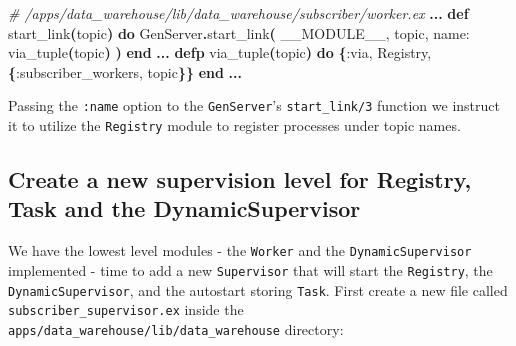 \documentclass[
  oneside]{book}
\newenvironment{Shaded}{\begin{snugshade}}{\end{snugshade}}
\newcommand{\CommentTok}[1]{\textcolor[rgb]{0.56,0.35,0.01}{\textit{#1}}}
\newcommand{\ConstantTok}[1]{\textcolor[rgb]{0.56,0.35,0.01}{#1}}
\newcommand{\FunctionTok}[1]{\textcolor[rgb]{0.13,0.29,0.53}{\textbf{#1}}}
\newcommand{\KeywordTok}[1]{\textcolor[rgb]{0.13,0.29,0.53}{\textbf{#1}}}
\newcommand{\NormalTok}[1]{#1}
\newcommand{\OperatorTok}[1]{\textcolor[rgb]{0.81,0.36,0.00}{\textbf{#1}}}
\newcommand{\VariableTok}[1]{\textcolor[rgb]{0.00,0.00,0.00}{#1}}
\begin{document}
\begin{Shaded}
\begin{Highlighting}[]
  \CommentTok{\# /apps/data\_warehouse/lib/data\_warehouse/subscriber/worker.ex}
  \OperatorTok{...}
  \KeywordTok{def}\NormalTok{ start\_link}\FunctionTok{(}\NormalTok{topic}\FunctionTok{)} \KeywordTok{do}
    \ConstantTok{GenServer}\OperatorTok{.}\NormalTok{start\_link}\FunctionTok{(}
      \ConstantTok{\_\_MODULE\_\_}\NormalTok{,}
\NormalTok{      topic,}
      \VariableTok{name:}\NormalTok{ via\_tuple}\FunctionTok{(}\NormalTok{topic}\FunctionTok{)}
    \FunctionTok{)}
  \KeywordTok{end}
  \OperatorTok{...}
  \KeywordTok{defp}\NormalTok{ via\_tuple}\FunctionTok{(}\NormalTok{topic}\FunctionTok{)} \KeywordTok{do}
    \FunctionTok{\{}\VariableTok{:via}\NormalTok{, }\ConstantTok{Registry}\NormalTok{, }\FunctionTok{\{}\VariableTok{:subscriber\_workers}\NormalTok{, topic}\FunctionTok{\}\}}
  \KeywordTok{end}
  \OperatorTok{...}    
\end{Highlighting}
\end{Shaded}

Passing the \texttt{:name} option to the \texttt{GenServer}'s \texttt{start\_link/3} function we instruct it to utilize the \texttt{Registry} module to register processes under topic names.

\subsection{Create a new supervision level for Registry, Task and the DynamicSupervisor}\label{create-a-new-supervision-level-for-registry-task-and-the-dynamicsupervisor}

We have the lowest level modules - the \texttt{Worker} and the \texttt{DynamicSupervisor} implemented - time to add a new \texttt{Supervisor} that will start the \texttt{Registry}, the \texttt{DynamicSupervisor}, and the autostart storing \texttt{Task}. First create a new file called \texttt{subscriber\_supervisor.ex} inside the \texttt{apps/data\_warehouse/lib/data\_warehouse} directory:
\end{document}

